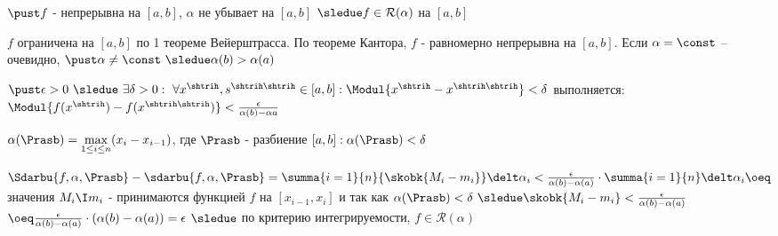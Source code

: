 \begin{proofs}
	$\pust f$ - непрерывна на $[a,b]$, $\alpha$ не убывает на $[a,b]$ $\sledue f \in \mathcal{R}(\alpha)$ на $[a,b]$
	\begin{dokvo}
		$f$ ограничена на $[a,b]$ по 1 теореме Вейерштрасса. По теореме Кантора, $f$ - равномерно непрерывна на $[a,b]$. Если $\alpha = \const$ -- очевидно, $\pust \alpha \neq \const \ \sledue \alpha(b) > \alpha(a)$

		$\pust \epsilon > 0 \ \sledue \ \exists \delta >0: \ \forall x^{\shtrih}, s^{\shtrih\shtrih} \in [a,b]: \Modul{x^{\shtrih} - x^{\shtrih\shtrih}} < \delta$ выполняется: $\Modul{f(x^{\shtrih}) - f(x^{\shtrih\shtrih})} < \frac{\epsilon}{\alpha(b) - \alpha{a}}$

		$\alpha(\Prasb) = \max\limits_{1 \leq i \leq n}(x_i - x_{i-1})$, где $\Prasb$ - разбиение $[a,b]: \alpha(\Prasb) < \delta$

		$\Sdarbu{f,\alpha,\Prasb} - \sdarbu{f,\alpha, \Prasb} = \summa{i=1}{n}{\skobk{M_i - m_i}}\delt\alpha_i < \frac{\epsilon}{\alpha(b) - \alpha(a)} \cdot \summa{i=1}{n}\delt\alpha_i \oeq$ значения $M_i \I m_i$ - принимаются функцией $f$ на $[x_{i-1}, x_i]$ и так как $\alpha(\Prasb) < \delta \ \sledue \skobk{M_i - m_i} < \frac{\epsilon}{\alpha(b) - \alpha(a)}$ $\oeq \frac{\epsilon}{\alpha(b)- \alpha(a)}\cdot (\alpha(b)- \alpha(a)) = \epsilon$ $\sledue$ по критерию интегрируемости, $f \in \mathcal{R}(\alpha)$
	\end{dokvo}
\end{proofs}

